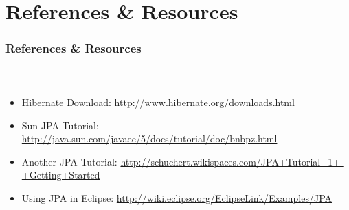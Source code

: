 \documentclass{beamer}
\begin{document}
\section{References \& Resources}
\begin{frame}
  \frametitle{References \& Resources}
  \framesubtitle{~}

\begin{itemize}
  \item Hibernate Download: \url{http://www.hibernate.org/downloads.html}
  \item Sun JPA Tutorial: \url{http://java.sun.com/javaee/5/docs/tutorial/doc/bnbpz.html}
  \item Another JPA Tutorial: \url{http://schuchert.wikispaces.com/JPA+Tutorial+1+-+Getting+Started}
  \item Using JPA in Eclipse: \url{http://wiki.eclipse.org/EclipseLink/Examples/JPA}
\end{itemize}
\end{frame}
\end{document}
